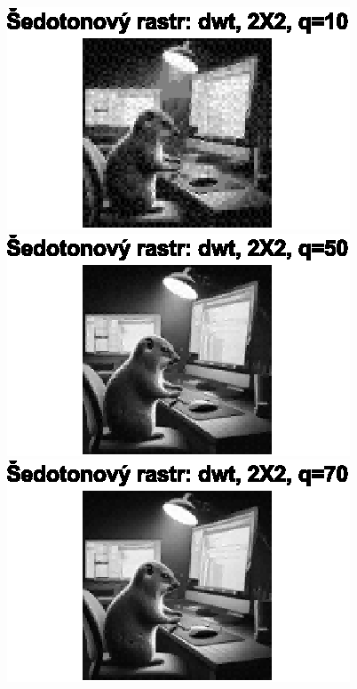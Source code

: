 \begin{figure}[H]
    \centering
    \begin{minipage}[b]{0.3\textwidth}
        \centering
        \includegraphics[width=\textwidth]{images/sedo_dwt_2X2_q10.eps}
    \end{minipage}
    \hfill
    \begin{minipage}[b]{0.3\textwidth}
        \centering
        \includegraphics[width=\textwidth]{images/sedo_dwt_2X2_q50.eps}
    \end{minipage}
    \hfill
    \begin{minipage}[b]{0.3\textwidth}
        \centering
        \includegraphics[width=\textwidth]{images/sedo_dwt_2X2_q70.eps}
    \end{minipage}
\end{figure}

